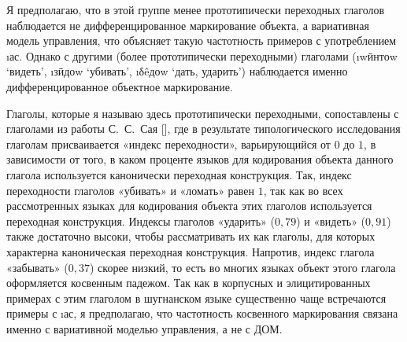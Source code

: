 Я предполагаю, что в этой группе менее прототипически переходных глаголов наблюдается не дифференцированное маркирование объекта, а вариативная модель управления, что объясняет такую частотность примеров с употреблением \i{ас}. Однако с другими (более прототипически переходными) глаголами (\i{wӣнтоw} ‘видеть’, \i{зӣдоw} ‘убивать’, \i{δêдоw} ‘дать, ударить’) наблюдается именно дифференцированное объектное маркирование.

Глаголы, которые я называю здесь прототипически переходными, сопоставлены с глаголами из работы С.~С.~Сая [\cite*[560–563]{sai2018}], где в результате типологического исследования глаголам присваивается «индекс переходности», варьирующийся от $0$ до $1$, в зависимости от того, в каком проценте языков для кодирования объекта данного глагола используется канонически переходная конструкция. Так, индекс переходности глаголов «убивать» и «ломать» равен $1$, так как во всех рассмотренных языках для кодирования объекта этих глаголов используется переходная конструкция. Индексы глаголов «ударить» ($0,79$) и «видеть» ($0,91$) также достаточно высоки, чтобы рассматривать их как глаголы, для которых характерна каноническая переходная конструкция. Напротив, индекс глагола «забывать» ($0,37$) скорее низкий, то есть во многих языках объект этого глагола оформляется косвенным падежом. Так как в корпусных и элицитированных примерах с этим глаголом в шугнанском языке существенно чаще встречаются примеры с \i{ас}, я предполагаю, что частотность косвенного маркирования связана именно с вариативной моделью управления, а не с ДОМ.

